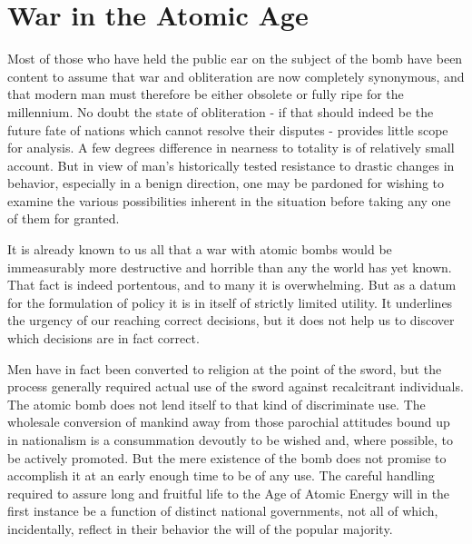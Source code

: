 
\chapter[War in the Atomic Age]{War in the Atomic Age}

\maketitle

\vspace{-2pt}


\vspace{39pt}

Most of those who have held the public ear on the subject of the bomb have been content to assume that war and obliteration are now completely synonymous, and that modern man must therefore be either obsolete or fully ripe for the millennium. No doubt the state of obliteration - if that should indeed be the future fate of nations which cannot resolve their disputes - provides little scope for analysis. A few degrees difference in nearness to totality is of relatively small account. But in view of man's historically tested resistance to drastic changes in behavior, especially in a benign direction, one may be pardoned for wishing to examine the various possibilities inherent in the situation before taking any one of them for granted.

It is already known to us all that a war with atomic bombs would be immeasurably more destructive and horrible than any the world has yet known. That fact is indeed portentous, and to many it is overwhelming. But as a datum for the formulation of policy it is in itself of strictly limited utility. It underlines the urgency of our reaching correct decisions, but it does not help us to discover which decisions are in fact correct.

Men have in fact been converted to religion at the point of the sword, but the process generally required actual use of the sword against recalcitrant individuals. The atomic bomb does not lend itself to that kind of discriminate use. The wholesale conversion of mankind away from those parochial attitudes bound up in nationalism is a consummation devoutly to be wished and, where possible, to be actively promoted. But the mere existence of the bomb does not promise to accomplish it at an early enough time to be of any use. The careful handling required to assure long and fruitful life to the Age of Atomic Energy will in the first instance be a function of distinct national governments, not all of which, incidentally, reflect in their behavior the will of the popular majority.

